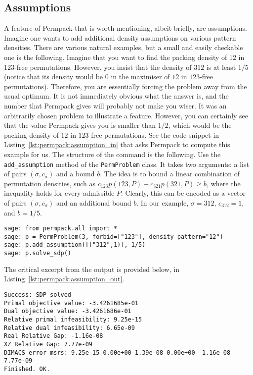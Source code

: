 \subsection{Assumptions}
A feature of Permpack that is worth mentioning, albeit briefly, are assumptions. Imagine one wants to add additional density assumptions on various pattern densities. There are various natural examples, but a small and easily checkable one is the following. Imagine that you want to find the packing density of $12$ in $123$-free permutations. However, you insist that the density of $312$ is at least $1/5$ (notice that its density would be $0$ in the maximiser of $12$ in $123$-free permutations). Therefore, you are essentially forcing the problem away from the usual optimum. It is not immediately obvious what the answer is, and the number that Permpack gives will probably not make you wiser. It was an arbitrarily chosen problem to illustrate a feature. However, you can certainly see that the value Permpack gives you is smaller than $1/2$, which would be the packing density of $12$ in $123$-free permutations. See the code snippet in Listing~\ref{lst:permpack:assumption_in} that asks Permpack to compute this example for us. The structure of the command is the following. Use the \texttt{add\_assumption} method of the \texttt{PermProblem} class. It takes two arguments: a list of pairs $(\sigma,c_\sigma)$ and a bound $b$. The idea is to bound a linear combination of permutation densities, such as $c_{123}p(123,P) + c_{321}p(321,P) \geq b$, where the inequality holds for every admissible $P$. Clearly, this can be encoded as a vector of pairs $(\sigma,c_\sigma)$ and an additional bound $b$. In our example, $\sigma = 312$, $c_{312} = 1$, and $b = 1/5$. 

 {}
\begin{lstlisting}
sage: from permpack.all import *
sage: p = PermProblem(3, forbid=["123"], density_pattern="12")
sage: p.add_assumption([("312",1)], 1/5)
sage: p.solve_sdp()
\end{lstlisting}

The critical excerpt from the output is provided below, in Listing~\ref{lst:permpack:assumption_out}.

\begin{lstlisting}
Success: SDP solved
Primal objective value: -3.4261685e-01 
Dual objective value: -3.4261686e-01 
Relative primal infeasibility: 9.25e-15 
Relative dual infeasibility: 6.65e-09 
Real Relative Gap: -1.16e-08 
XZ Relative Gap: 7.77e-09 
DIMACS error msrs: 9.25e-15 0.00e+00 1.39e-08 0.00e+00 -1.16e-08 7.77e-09
Finished. OK.
\end{lstlisting}

